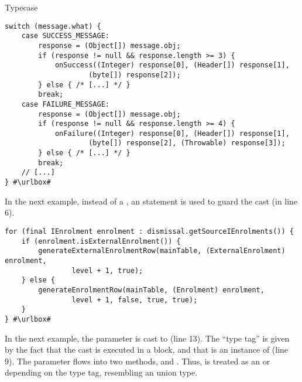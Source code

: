 \begin{pattern}{Typecase}
\def\urlvar{http://bit.ly/loopj_android_async_http_2IpIULk}
\begin{verbatim}
switch (message.what) {
    case SUCCESS_MESSAGE:
        response = (Object[]) message.obj;
        if (response != null && response.length >= 3) {
            onSuccess((Integer) response[0], (Header[]) response[1],
					(byte[]) response[2]);
        } else { /* [...] */ }
        break;
    case FAILURE_MESSAGE:
        response = (Object[]) message.obj;
        if (response != null && response.length >= 4) {
            onFailure((Integer) response[0], (Header[]) response[1],
                    (byte[]) response[2], (Throwable) response[3]);
        } else { /* [...] */ }
        break;
    // [...]
} #\urlbox#
\end{verbatim}

In the next example, instead of a ,
an  statement is used to guard the cast (in line 6).

\def\urlvar{http://bit.ly/FenixEdu_fenixedu_academic_2SUNOUJ}
\begin{verbatim}
for (final IEnrolment enrolment : dismissal.getSourceIEnrolments()) {
    if (enrolment.isExternalEnrolment()) {
        generateExternalEnrolmentRow(mainTable, (ExternalEnrolment) enrolment,
                level + 1, true);
    } else {
        generateEnrolmentRow(mainTable, (Enrolment) enrolment,
                level + 1, false, true, true);
    }
} #\urlbox#
\end{verbatim}

In the next example,
the parameter  is cast to  (line 13).
The ``type tag'' is given by the fact that the cast is executed in a  block,
and that  is an instance of  (line 9).
The  parameter flows into two methods,
 and
.
Thus,  is treated as an  or  depending on the type tag, resembling an union type.


\end{pattern}
